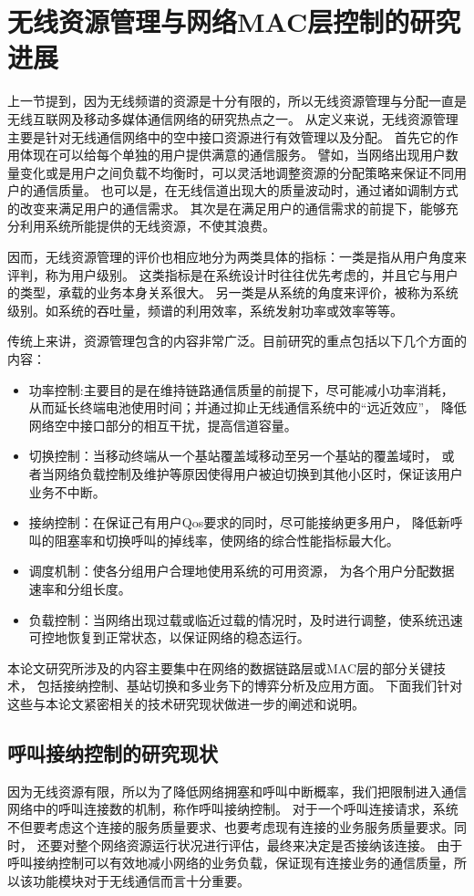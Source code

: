 \section{无线资源管理与网络MAC层控制的研究进展}
上一节提到，因为无线频谱的资源是十分有限的，所以无线资源管理与分配一直是无线互联网及移动多媒体通信网络的研究热点之一。
从定义来说，无线资源管理主要是针对无线通信网络中的空中接口资源进行有效管理以及分配。
首先它的作用体现在可以给每个单独的用户提供满意的通信服务。
譬如，当网络出现用户数量变化或是用户之间负载不均衡时，可以灵活地调整资源的分配策略来保证不同用户的通信质量。
也可以是，在无线信道出现大的质量波动时，通过诸如调制方式的改变来满足用户的通信需求。
其次是在满足用户的通信需求的前提下，能够充分利用系统所能提供的无线资源，不使其浪费。

因而，无线资源管理的评价也相应地分为两类具体的指标：一类是指从用户角度来评判，称为用户级别。
这类指标是在系统设计时往往优先考虑的，并且它与用户的类型，承载的业务本身关系很大。
另一类是从系统的角度来评价，被称为系统级别。如系统的吞吐量，频谱的利用效率，系统发射功率或效率等等。

%
传统上来讲，资源管理包含的内容非常广泛。目前研究的重点包括以下几个方面的内容：

\begin{itemize}
\item 功率控制:主要目的是在维持链路通信质量的前提下，尽可能减小功率消耗，
从而延长终端电池使用时间；并通过抑止无线通信系统中的“远近效应”，
降低网络空中接口部分的相互干扰，提高信道容量。
\item 切换控制：当移动终端从一个基站覆盖域移动至另一个基站的覆盖域时，
    或者当网络负载控制及维护等原因使得用户被迫切换到其他小区时，保证该用户业务不中断。
\item 接纳控制：在保证己有用户Qos要求的同时，尽可能接纳更多用户，
    降低新呼叫的阻塞率和切换呼叫的掉线率，使网络的综合性能指标最大化。
\item 调度机制：使各分组用户合理地使用系统的可用资源，
    为各个用户分配数据速率和分组长度。
\item 负载控制：当网络出现过载或临近过载的情况时，及时进行调整，使系统迅速可控地恢复到正常状态，以保证网络的稳态运行。
\end{itemize}

本论文研究所涉及的内容主要集中在网络的数据链路层或MAC层的部分关键技术，
包括接纳控制、基站切换和多业务下的博弈分析及应用方面。
下面我们针对这些与本论文紧密相关的技术研究现状做进一步的阐述和说明。
\subsection{呼叫接纳控制的研究现状}
因为无线资源有限，所以为了降低网络拥塞和呼叫中断概率，我们把限制进入通信网络中的呼叫连接数的机制，称作呼叫接纳控制。
对于一个呼叫连接请求，系统不但要考虑这个连接的服务质量要求、也要考虑现有连接的业务服务质量要求。同时，
还要对整个网络资源运行状况进行评估，最终来决定是否接纳该连接\cite{Ahmed2005}\cite{Ghaderi_Boutaba_2006}。
由于呼叫接纳控制可以有效地减小网络的业务负载，保证现有连接业务的通信质量，所以该功能模块对于无线通信而言十分重要。

